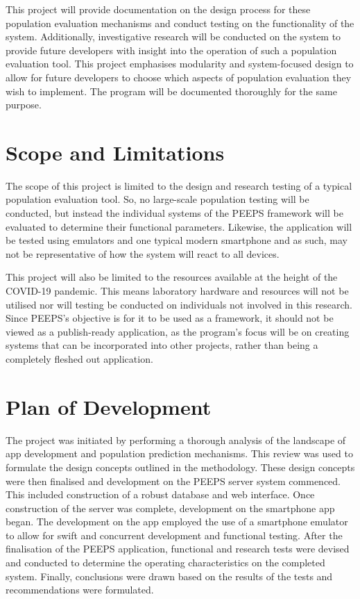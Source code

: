 This project will provide documentation on the design process for these population evaluation mechanisms and conduct testing on the functionality of the system. Additionally, investigative research will be conducted on the system to provide future developers with insight into the operation of such a population evaluation tool. This project emphasises modularity and system-focused design to allow for future developers to choose which aspects of population evaluation they wish to implement. The program will be documented thoroughly for the same purpose.


\section{Scope and Limitations}
The scope of this project is limited to the design and research testing of a typical population evaluation tool. So, no large-scale population testing will be conducted, but instead the individual systems of the PEEPS framework will be evaluated to determine their functional parameters. Likewise, the application will be tested using emulators and one typical modern smartphone and as such, may not be representative of how the system will react to all devices. 

This project will also be limited to the resources available at the height of the COVID-19 pandemic. This means laboratory hardware and resources will not be utilised nor will testing be conducted on individuals not involved in this research. Since PEEPS's objective is for it to be used as a framework, it should not be viewed as a publish-ready application, as the program's focus will be on creating systems that can be incorporated into other projects, rather than being a completely fleshed out application.


\section{Plan of Development}
The project was initiated by performing a thorough analysis of the landscape of app development and population prediction mechanisms. This review was used to formulate the design concepts outlined in the methodology. These design concepts were then finalised and development on the PEEPS server system commenced. This included construction of a robust database and web interface. Once construction of the server was complete, development on the smartphone app began. The development on the app employed the use of a smartphone emulator to allow for swift and concurrent development and functional testing. After the finalisation of the PEEPS application, functional and research tests were devised and conducted to determine the operating characteristics on the completed system. Finally, conclusions were drawn based on the results of the tests and recommendations were formulated.

